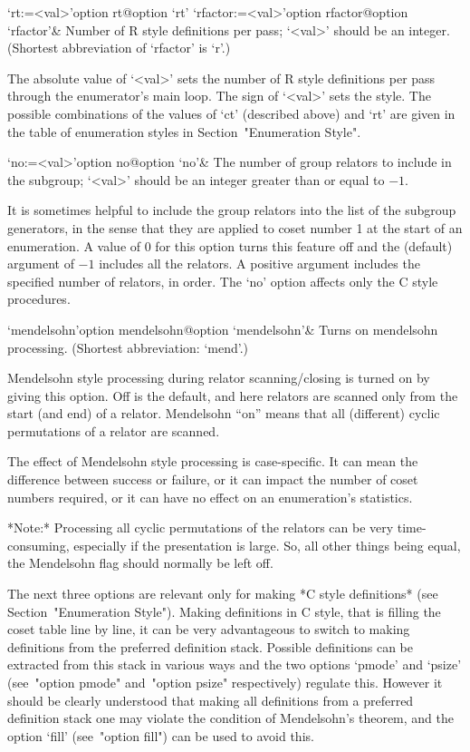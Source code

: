 \>`rt:=<val>'{option rt}@{option `rt'}
\>`rfactor:=<val>'{option rfactor}@{option `rfactor'}&
Number of R style definitions per pass; `<val>' should be an  integer. 
(Shortest abbreviation of `rfactor' is `r'.)

The absolute value of `<val>' sets the number of R  style  definitions
per pass through the enumerator's main loop. The sign of `<val>'  sets
the style. The possible combinations of the values of `ct'  (described
above) and `rt' are given  in  the  table  of  enumeration  styles  in
Section~"Enumeration Style".

\>`no:=<val>'{option no}@{option `no'}&
The number of group relators to include in the subgroup;  
`<val>' should be an integer greater than or equal to $-1$.

It is sometimes helpful to include the group relators into the list of
the subgroup generators, in the sense that they are applied  to  coset
number 1 at the start of an enumeration. A value of 0 for this  option
turns this feature off and the (default) argument of $-1$ includes all
the relators. A positive argument includes  the  specified  number  of
relators,  in  order.  The  `no'  option  affects  only  the   C style
procedures.

\>`mendelsohn'{option mendelsohn}@{option `mendelsohn'}&
Turns on mendelsohn processing. (Shortest abbreviation: `mend'.)

Mendelsohn style processing during relator scanning/closing is  turned
on by giving this option. Off is the default, and  here  relators  are
scanned only from the start (and end) of a relator. Mendelsohn  ``on''
means that all  (different)  cyclic  permutations  of  a  relator  are
scanned.

The effect of Mendelsohn style processing  is  case-specific.  It  can
mean the difference between success or failure, or it can  impact  the
number of coset numbers required, or it  can  have  no  effect  on  an
enumeration's statistics.

*Note:* Processing all cyclic permutations of the relators can be very
time-consuming,  especially if  the  presentation is  large.  So,  all
other things being equal, the  Mendelsohn flag should normally be left
off.

\enditems


The  next  three  options  are  relevant  only  for  making  *C  style
definitions* (see Section~"Enumeration Style"). Making definitions  in
C style, that is filling the coset table line by line, it can be  very
advantageous to  switch  to  making  definitions  from  the  preferred
definition stack. Possible definitions  can  be  extracted  from  this
stack in  various  ways  and  the  two  options  `pmode'  and  `psize'
(see~"option pmode" and~"option psize"  respectively)  regulate  this.
However it should be clearly understood that  making  all  definitions
from a preferred definition stack one may  violate  the  condition  of
Mendelsohn's theorem, and the option `fill' (see~"option fill") can be
used to avoid this.

